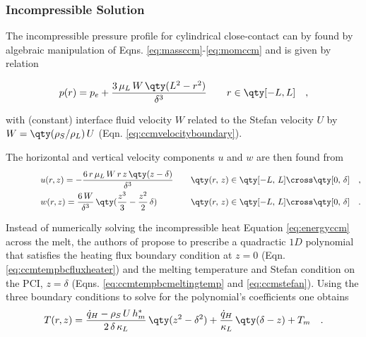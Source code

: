 \subsubsection{Incompressible Solution}

The incompressible pressure profile for cylindrical close-contact can by found by algebraic manipulation of Eqns. \ref{eq:massccm}-\ref{eq:momccm} \cite{schuller2019icarus} and is given by relation 

\begin{equation}\label{eq:pincompcylinder}
    p(r) = p_e + \frac{3\,\mu_L\,W\,\qty(L^2-r^2)}{\delta^3} \quad \quad r \in \qty[-L,L] \quad ,
\end{equation}

with (constant) interface fluid velocity $W$ related to the Stefan velocity $U$ by $W = \qty(\rho_S / \rho_L)\, U$ (Eqn. \ref{eq:ccmvelocityboundary}). 

The horizontal and vertical velocity components $u$ and $w$ are then found from
\begin{subequations}\label{eq:incompccmvelocity}
\begin{flalign} 
    \qquad \qquad & u(r,z) = -\frac{6\,r\,\mu_L\,W\,r\,z\,\qty(z-\delta)}{\delta^3} & \quad \qty(r,\,z)\in \qty[-L,\,L]\cross\qty[0,\,\delta] \quad ,\\
    \qquad \qquad &  w(r,z) = \frac{6\,W}{\delta^3}\,\qty(\frac{z^3}{3} - \frac{z^2}{2}\,\delta) & \quad \qty(r,\,z)\in \qty[-L,\,L]\cross\qty[0,\,\delta] \quad .
\end{flalign}
\end{subequations}


Instead of numerically solving the incompressible heat Equation \ref{eq:energyccm} across the melt, the authors of \cite{schuller2019icarus} propose to prescribe a quadractic $1D$ polynomial that satisfies the heating flux boundary condition at $z=0$ (Eqn. \ref{eq:ccmtempbcfluxheater}) and the melting temperature and Stefan condition on the \gls{PCI}, $z=\delta$ (Eqns. \ref{eq:ccmtempbcmeltingtemp} and \ref{eq:ccmstefan}). Using the three boundary conditions to solve for the polynomial's coefficients one obtains 
\begin{equation}\label{eq:temperaturequadraticreview}
    T(r,z) = \frac{\Dot{q}_H - \rho_S\,U\,h_m^*}{2\,\delta\,\kappa_L}\,\qty(z^2-\delta^2) + \frac{\Dot{q}_H}{\kappa_L}\,\qty(\delta - z) + T_m \quad .
\end{equation}

